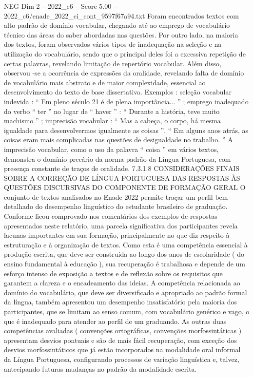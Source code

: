 \begin{textsample}{NEG Dim 2 – 2022\_c6 – Score 5.00 – 2022\_c6/enade\_2022\_ci\_cont\_9597f67a94.txt}
Foram encontrados textos com alto padrão de domínio vocabular, chegando até ao emprego de vocabulário técnico das áreas do saber abordadas nas questões.
Por outro lado, na maioria dos textos, foram observados vários tipos de inadequação na seleção e na utilização do vocabulário, sendo que o principal deles foi a excessiva repetição de certas palavras, revelando limitação de repertório vocabular.
Além disso, observou -se a ocorrência de expressões da oralidade, revelando falta de domínio de vocabulário mais abstrato e de maior complexidade, essencial ao desenvolvimento do texto de base dissertativa.
Exemplos : seleção vocabular indevida : “ Em pleno século 21 é de plena importância... ” ; emprego inadequado do verbo “ ter ” no lugar de “ haver ” : “ Durante a história, teve muito machismo ” ; imprecisão vocabular : “ Mas a cabeça, o corpo, há mesma igualdade para desenvolvermos igualmente as coisas ”, “ Em alguns anos atrás, as coisas eram mais complicadas nas questões de desigualdade no trabalho. ” A imprecisão vocabular, como o uso da palavra “ coisa ” em vários textos, demonstra o domínio precário da norma-padrão da Língua Portuguesa, com presença constante de traços de oralidade. 7.3.1.8 CONSIDERAÇÕES FINAIS SOBRE A CORREÇÃO DE LÍNGUA PORTUGUESA DAS RESPOSTAS ÀS QUESTÕES DISCURSIVAS DO COMPONENTE DE FORMAÇÃO GERAL O conjunto de textos analisados no Enade 2022 permite traçar um perfil bem detalhado do desempenho linguístico do estudante brasileiro de graduação.
Conforme ficou comprovado nos comentários dos exemplos de respostas apresentados neste relatório, uma parcela significativa dos participantes revela lacunas importantes em sua formação, principalmente no que diz respeito à estruturação e à organização de textos.
Como esta é uma competência essencial à produção escrita, que deve ser construída ao longo dos anos de escolaridade ( do ensino fundamental à educação ), sua recuperação é trabalhosa e depende de um esforço intenso de exposição a textos e de reflexão sobre os requisitos que garantem a clareza e o encadeamento das ideias.
A competência relacionada ao domínio do vocabulário, que deve ser diversificado e apropriado ao padrão formal da língua, também apresentou um desempenho insatisfatório pela maioria dos participantes, que se limitam ao senso comum, com vocabulário genérico e vago, o que é inadequado para atender ao perfil de um graduando.
As outras duas competências avaliadas ( convenções ortográficas, convenções morfossintáticas ) apresentam desvios pontuais e são de mais fácil recuperação, com exceção dos desvios morfossintáticos que já estão incorporados na modalidade oral informal da Língua Portuguesa, configurando processos de variação linguística e, talvez, antecipando futuras mudanças no padrão da modalidade escrita.

\end{textsample}
